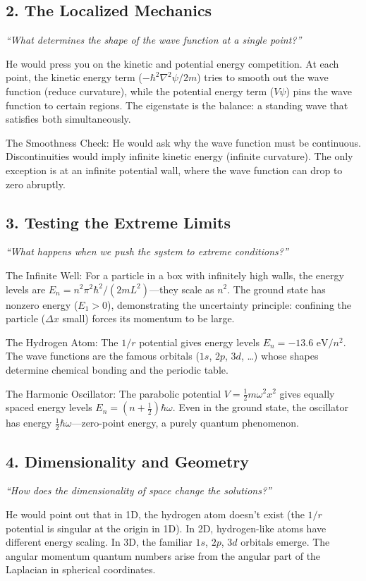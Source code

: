 \subsection*{2. The Localized Mechanics}
\textit{``What determines the shape of the wave function at a single point?''}

He would press you on the kinetic and potential energy competition. At each point, the kinetic energy term ($-\hbar^2\nabla^2\psi/2m$) tries to smooth out the wave function (reduce curvature), while the potential energy term ($V\psi$) pins the wave function to certain regions. The eigenstate is the balance: a standing wave that satisfies both simultaneously.

The Smoothness Check: He would ask why the wave function must be continuous. Discontinuities would imply infinite kinetic energy (infinite curvature). The only exception is at an infinite potential wall, where the wave function can drop to zero abruptly.

\subsection*{3. Testing the Extreme Limits}
\textit{``What happens when we push the system to extreme conditions?''}

The Infinite Well: For a particle in a box with infinitely high walls, the energy levels are $E_n = n^2 \pi^2 \hbar^2 / (2mL^2)$---they scale as $n^2$. The ground state has nonzero energy ($E_1 > 0$), demonstrating the uncertainty principle: confining the particle ($\Delta x$ small) forces its momentum to be large.

The Hydrogen Atom: The $1/r$ potential gives energy levels $E_n = -13.6 \text{ eV}/n^2$. The wave functions are the famous orbitals ($1s$, $2p$, $3d$, \ldots) whose shapes determine chemical bonding and the periodic table.

The Harmonic Oscillator: The parabolic potential $V = \frac{1}{2}m\omega^2 x^2$ gives equally spaced energy levels $E_n = (n + \frac{1}{2})\hbar\omega$. Even in the ground state, the oscillator has energy $\frac{1}{2}\hbar\omega$---zero-point energy, a purely quantum phenomenon.

\subsection*{4. Dimensionality and Geometry}
\textit{``How does the dimensionality of space change the solutions?''}

He would point out that in 1D, the hydrogen atom doesn't exist (the $1/r$ potential is singular at the origin in 1D). In 2D, hydrogen-like atoms have different energy scaling. In 3D, the familiar $1s$, $2p$, $3d$ orbitals emerge. The angular momentum quantum numbers arise from the angular part of the Laplacian in spherical coordinates.

